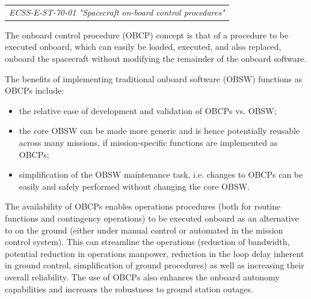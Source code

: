 \begin{tabular}{l}
\textit{ECSS-E-ST-70-01 "Spacecraft on-board control procedures" \cite{ECSS-E-ST-70-01}} \\
\end{tabular}

The onboard control procedure (OBCP) concept is that of a procedure to be executed onboard, which can easily be loaded, executed, and also replaced, onboard the spacecraft without modifying the remainder of the onboard software. 

The benefits of implementing traditional onboard software (OBSW) functions as OBCPs include:
\begin{itemize}
\item the relative ease of development and validation of OBCPs vs. OBSW;
\item the core OBSW can be made more generic and is hence potentially reusable across many missions, if mission-specific functions are implemented as OBCPs; 
\item simplification of the OBSW maintenance task, i.e. changes to OBCPs can be easily and safely performed without changing the core OBSW. 
\end{itemize}

The availability of OBCPs enables operations procedures (both for routine functions and contingency operations) to be executed onboard as an alternative to on the ground (either  under manual control or automated in the mission control system). This can streamline the operations (reduction of bandwidth, potential reduction in operations manpower, reduction in  the loop delay inherent in ground control, simplification of ground procedures) as well as increasing their overall reliability. The use of  OBCPs also enhances the onboard autonomy capabilities and increases the robustness to ground station outages. 

